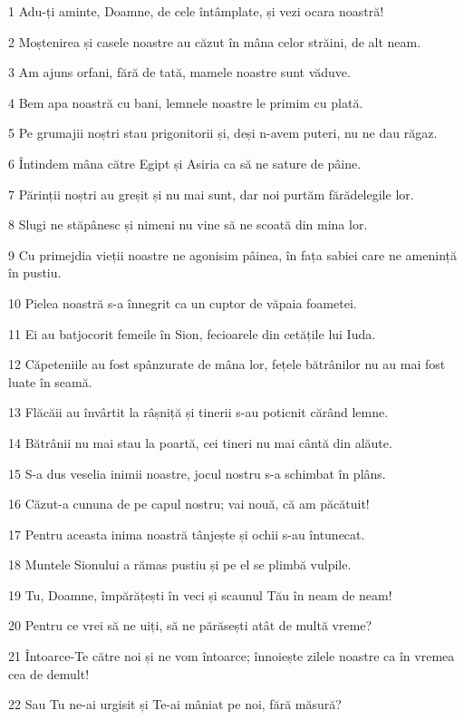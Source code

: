 \par 1 Adu-ți aminte, Doamne, de cele întâmplate, și vezi ocara noastră!
\par 2 Moștenirea și casele noastre au căzut în mâna celor străini, de alt neam.
\par 3 Am ajuns orfani, fără de tată, mamele noastre sunt văduve.
\par 4 Bem apa noastră cu bani, lemnele noastre le primim cu plată.
\par 5 Pe grumajii noștri stau prigonitorii și, deși n-avem puteri, nu ne dau răgaz.
\par 6 Întindem mâna către Egipt și Asiria ca să ne sature de pâine.
\par 7 Părinții noștri au greșit și nu mai sunt, dar noi purtăm fărădelegile lor.
\par 8 Slugi ne stăpânesc și nimeni nu vine să ne scoată din mina lor.
\par 9 Cu primejdia vieții noastre ne agonisim pâinea, în fața sabiei care ne amenință în pustiu.
\par 10 Pielea noastră s-a înnegrit ca un cuptor de văpaia foametei.
\par 11 Ei au batjocorit femeile în Sion, fecioarele din cetățile lui Iuda.
\par 12 Căpeteniile au fost spânzurate de mâna lor, fețele bătrânilor nu au mai fost luate în seamă.
\par 13 Flăcăii au învârtit la râșniță și tinerii s-au poticnit cărând lemne.
\par 14 Bătrânii nu mai stau la poartă, cei tineri nu mai cântă din alăute.
\par 15 S-a dus veselia inimii noastre, jocul nostru s-a schimbat în plâns.
\par 16 Căzut-a cununa de pe capul nostru; vai nouă, că am păcătuit!
\par 17 Pentru aceasta inima noastră tânjește și ochii s-au întunecat.
\par 18 Muntele Sionului a rămas pustiu și pe el se plimbă vulpile.
\par 19 Tu, Doamne, împărățești în veci și scaunul Tău în neam de neam!
\par 20 Pentru ce vrei să ne uiți, să ne părăsești atât de multă vreme?
\par 21 Întoarce-Te către noi și ne vom întoarce; înnoiește zilele noastre ca în vremea cea de demult!
\par 22 Sau Tu ne-ai urgisit și Te-ai mâniat pe noi, fără măsură?



